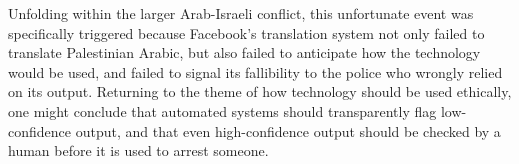 Unfolding within the larger Arab-Israeli conflict, this unfortunate event was specifically triggered because Facebook's translation system not only failed to translate Palestinian Arabic, but also failed to anticipate how the technology would be used, and failed to signal its fallibility to the police who wrongly relied on its output.  Returning to the theme of how technology should be used ethically, one might conclude that automated systems should transparently flag low-confidence output, and that even high-confidence output should be checked by a human before it is used to arrest someone.














